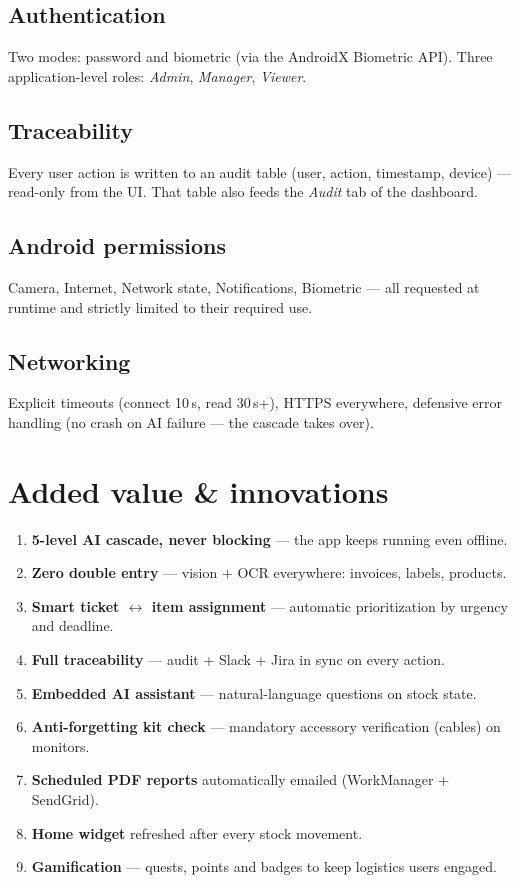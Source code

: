 \documentclass[11pt,a4paper]{article}
\begin{document}
\subsection{Authentication}
Two modes: password and biometric (via the AndroidX Biometric API).
Three application-level roles: \emph{Admin}, \emph{Manager},
\emph{Viewer}.

\subsection{Traceability}
Every user action is written to an audit table (user, action,
timestamp, device) — read-only from the UI. That table also feeds
the \emph{Audit} tab of the dashboard.

\subsection{Android permissions}
Camera, Internet, Network state, Notifications, Biometric — all
requested at runtime and strictly limited to their required use.

\subsection{Networking}
Explicit timeouts (connect 10\,s, read 30\,s+), HTTPS everywhere,
defensive error handling (no crash on AI failure — the cascade takes
over).

\section{Added value \& innovations}

\begin{ideabox}[Differentiators]
\begin{enumerate}
  \item \textbf{5-level AI cascade, never blocking} — the app keeps
        running even offline.
  \item \textbf{Zero double entry} — vision + OCR everywhere:
        invoices, labels, products.
  \item \textbf{Smart ticket $\leftrightarrow$ item assignment} —
        automatic prioritization by urgency and deadline.
  \item \textbf{Full traceability} — audit + Slack + Jira in sync on
        every action.
  \item \textbf{Embedded AI assistant} — natural-language questions
        on stock state.
  \item \textbf{Anti-forgetting kit check} — mandatory accessory
        verification (cables) on monitors.
  \item \textbf{Scheduled PDF reports} automatically emailed
        (WorkManager + SendGrid).
  \item \textbf{Home widget} refreshed after every stock movement.
  \item \textbf{Gamification} — quests, points and badges to keep
        logistics users engaged.
\end{enumerate}
\end{ideabox}
\end{document}

